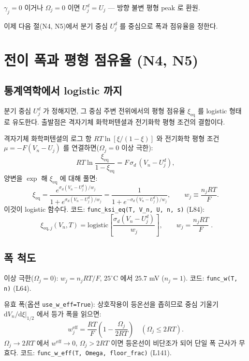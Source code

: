 \documentclass[11pt,a4paper]{article}
\newcommand{\dd}{\mathrm{d}}
\newcommand{\eq}{\mathrm{eq}}
\newcommand{\eff}{\mathrm{eff}}
\begin{document}
$\gamma_j=0$ 이거나 $\Omega_j=0$ 이면 $U_j^d = U_j$ — 방향 불변 평형 peak 로 환원.

이제 다음 절(N4, N5)에서 분기 중심 $U_j^d$ 를 중심으로 폭과 점유율을 정한다.

\section{전이 폭과 평형 점유율 (N4, N5)}\label{sec:eqocc}

\subsection{통계역학에서 logistic 까지}

분기 중심 $U_j^d$ 가 정해지면, 그 중심 주변 전위에서의 평형 점유율 $\xi_\eq$ 를
logistic 형태로 유도한다. 출발점은 격자기체 화학퍼텐셜과 전기화학 평형 조건의 결합이다.

격자기체 화학퍼텐셜의 로그 항 $RT\ln[\xi/(1-\xi)]$ 와 전기화학 평형 조건
$\mu = -F(V_n - U_j)$ 를 연결하면($\Omega_j=0$ 이상 극한):
\begin{equation}
RT\ln\frac{\xi_\eq}{1-\xi_\eq} = F\,\sigma_d\,(V_n - U_j^d),
\end{equation}
양변을 $\exp$ 해 $\xi_\eq$ 에 대해 풀면:
\begin{equation}
\xi_\eq = \frac{e^{\sigma_d(V_n-U_j^d)/w_j}}{1+e^{\sigma_d(V_n-U_j^d)/w_j}}
= \frac{1}{1+e^{-\sigma_d(V_n-U_j^d)/w_j}},\qquad
w_j \equiv \frac{n_j RT}{F}.
\label{eq:ksi_eq_deriv}
\end{equation}
이것이 logistic 함수다. 코드:
\texttt{func\_ksi\_eq(T, V\_n, U, n, s)} (L84):
\begin{equation}
\boxed{\;\xi_{\eq,j}(V_n, T) = \mathrm{logistic}\!\left[\frac{\sigma_d(V_n - U_j^d)}{w_j}\right],\qquad
w_j = \frac{n_j RT}{F}\;.}
\label{eq:ksi_eq}
\end{equation}

\subsection{폭 척도}

이상 극한($\Omega_j=0$): $w_j = n_j RT/F$, $25^\circ$C 에서 $25.7$ mV ($n_j=1$).
코드: \texttt{func\_w(T, n)} (L64).

유효 폭(옵션 \texttt{use\_w\_eff=True}): 상호작용이 등온선을 좁히므로 중심 기울기
$\dd V_n/\dd\xi|_{1/2}$ 에서 등가 폭을 읽으면:
\begin{equation}
w_j^\eff = \frac{RT}{F}\left(1 - \frac{\Omega_j}{2RT}\right)
\quad(\Omega_j \le 2RT).
\label{eq:weff}
\end{equation}
$\Omega_j \to 2RT$ 에서 $w^\eff \to 0$, $\Omega_j > 2RT$ 이면 등온선이 비단조가 되어
단일 폭 근사가 무효다. 코드: \texttt{func\_w\_eff(T, Omega, floor\_frac)} (L141).
\end{document}
